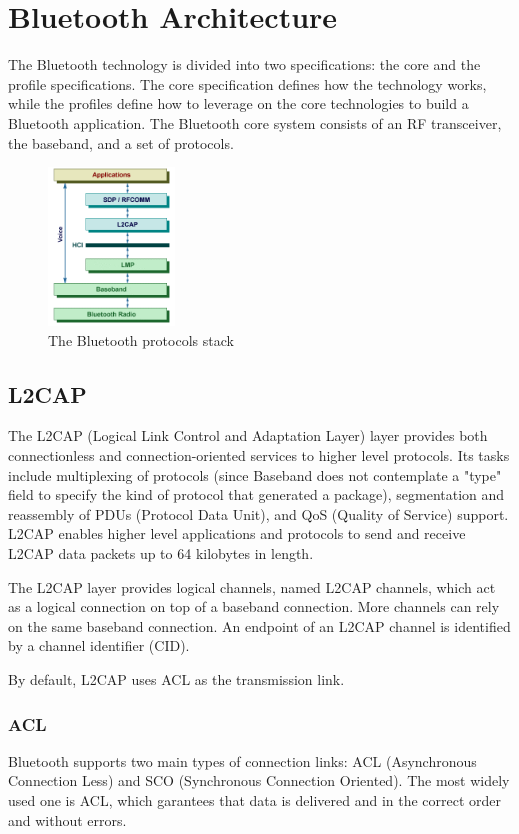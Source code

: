 \section{Bluetooth Architecture}
The Bluetooth technology is divided into two specifications: the core and the profile specifications. The core specification defines how the technology works, while the profiles define how to leverage on the core technologies to build a Bluetooth application.
The Bluetooth core system consists of an RF transceiver, the baseband, and a set of protocols.

\begin{figure}[ht!]
  \centering
  \includegraphics[width=0.3\textwidth]{img/bluetooth_protocol_stack.png} 
  \caption{The Bluetooth protocols stack}
\end{figure}

\subsection{L2CAP}
The L2CAP (Logical Link Control and Adaptation Layer) layer provides both connectionless and connection-oriented services to higher level protocols. Its tasks include multiplexing of protocols (since Baseband does not contemplate a "type" field to specify the kind of protocol that generated a package), segmentation and reassembly of PDUs (Protocol Data Unit), and QoS (Quality of Service) support.
L2CAP enables higher level applications and protocols to send and receive L2CAP data packets up to 64 kilobytes in length.

The L2CAP layer provides logical channels, named L2CAP channels, which act as a logical connection on top of a baseband connection.
More channels can rely on the same baseband connection.
An endpoint of an L2CAP channel is identified by a channel identifier (CID).

By default, L2CAP uses ACL as the transmission link.

\subsubsection{ACL}
Bluetooth supports two main types of connection links: ACL (Asynchronous Connection Less) and SCO (Synchronous Connection Oriented).
The most widely used one is ACL, which garantees that data is delivered and in the correct order and without errors.

